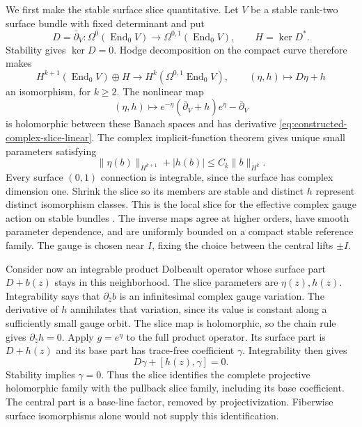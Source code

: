 \documentclass[11pt]{amsart}
\theoremstyle{definition}
\theoremstyle{remark}
\theoremstyle{plain}
\newcommand{\End}{\operatorname{End}}
\begin{document}
We first make the stable surface slice quantitative. Let $V$ be a stable
rank-two surface bundle with fixed determinant and put
\[
 D=\bar\partial_V:\Omega^0(\End_0V)\longrightarrow\Omega^{0,1}(\End_0V),
                         \qquad H=\ker D^*.
\]
Stability gives $\ker D=0$. Hodge decomposition on the compact curve
therefore makes
\begin{equation}\label{eq:constructed-complex-slice-linear}
 H^{k+1}(\End_0V)\oplus H\longrightarrow H^k(\Omega^{0,1}\End_0V),
                     \qquad (\eta,h)\longmapsto D\eta+h
\end{equation}
an isomorphism, for $k\geq2$. The nonlinear map
\[
        (\eta,h)\longmapsto
        e^{-\eta}(\bar\partial_V+h)e^\eta-\bar\partial_V
\]
is holomorphic between these Banach spaces and has derivative
\eqref{eq:constructed-complex-slice-linear}. The complex implicit-function
theorem gives unique small parameters satisfying
\begin{equation}\label{eq:constructed-complex-slice-bound}
               \|\eta(b)\|_{H^{k+1}}+|h(b)|\leq C_k\|b\|_{H^k}.
\end{equation}
Every surface $(0,1)$ connection is integrable, since the surface has
complex dimension one. Shrink the slice so its members are stable and
distinct $h$ represent distinct isomorphism classes. This is the local
slice for the effective complex gauge action on stable bundles
\cite[Section~4, pp.~769--770]{Owens01}. The inverse maps agree at
higher orders, have smooth parameter dependence, and are uniformly
bounded on a compact stable reference family. The gauge is chosen near
$I$, fixing the choice between the central lifts $\pm I$.

Consider now an integrable product Dolbeault operator whose surface
part $D+b(z)$ stays in this neighborhood. The slice parameters are
$\eta(z),h(z)$. Integrability says that $\partial_{\bar z}b$ is an
infinitesimal complex gauge variation. The derivative of $h$ annihilates
that variation, since its value is constant along a sufficiently small
gauge orbit. The slice map is holomorphic, so the chain rule gives
$\partial_{\bar z}h=0$. Apply $g=e^\eta$ to the full product operator.
Its surface part is $D+h(z)$ and its base part has trace-free coefficient
$\gamma$. Integrability then gives
\begin{equation}\label{eq:constructed-slice-base-coefficient}
                            D\gamma+[h(z),\gamma]=0.
\end{equation}
Stability implies $\gamma=0$. Thus the slice identifies the complete
projective holomorphic family with the pullback slice family, including
its base coefficient. The central part is a base-line factor, removed
by projectivization. Fiberwise surface isomorphisms alone would not
supply this identification.
\end{document}
